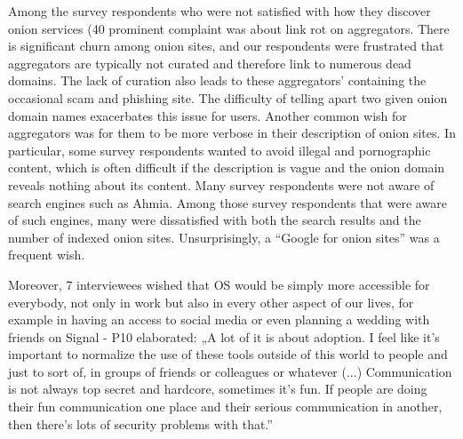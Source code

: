 Among the survey respondents who were not satisfied with how they discover onion services (40%
prominent complaint was about link rot on aggregators.  There is significant
churn among onion sites, and our respondents were frustrated that aggregators
are typically not curated and therefore link to numerous dead domains.  The lack
of curation also leads to these aggregators' containing the occasional scam and
phishing site.  The difficulty of telling apart two given onion domain names
exacerbates this issue for users.  Another common wish for aggregators was for
them to be more verbose in their description of onion sites.  In particular,
some survey respondents wanted to avoid illegal and pornographic content, which is often
difficult if the description is vague and the onion domain reveals nothing about
its content.  Many survey respondents were not aware of search engines such as Ahmia.
Among those survey respondents that were aware of such engines, many were dissatisfied with both the search results and
the number of indexed onion sites.  Unsurprisingly, a ``Google for onion sites''
was a frequent wish.


Moreover, 7 interviewees wished that OS would be simply more accessible for everybody, not only in work but also in every other aspect of our lives, for example in having an access to social media or even planning a wedding with friends on Signal - P10 elaborated: „A lot of it is about adoption. I feel like it's important to normalize the use of these tools outside of this world to people and just to sort of, in groups of friends or colleagues or whatever (...) Communication is not always top secret and hardcore, sometimes it's fun. If people are doing their fun communication one place and their serious communication in another, then there's lots of security problems with that.” 


